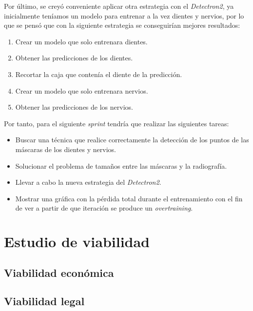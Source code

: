Por último, se creyó conveniente aplicar otra estrategia con el \emph{Detectron2}, ya inicialmente teníamos un modelo para entrenar a la vez dientes y nervios, por lo que se pensó que con la siguiente estrategia se conseguirían mejores resultados:
\begin{enumerate}
    \item Crear un modelo que solo entrenara dientes.
    \item Obtener las predicciones de los dientes.
    \item Recortar la caja que contenía el diente de la predicción.
    \item Crear un modelo que solo entrenara nervios.
    \item Obtener las predicciones de los nervios.
\end{enumerate}
Por tanto, para el siguiente \emph{sprint} tendría que realizar las siguientes tareas:
\begin{itemize}
    \item Buscar una técnica que realice correctamente la detección de los puntos de las máscaras de los dientes y nervios.
    \item Solucionar el problema de tamaños entre las máscaras y la radiografía.
    \item Llevar a cabo la nueva estrategia del \emph{Detectron2}.
    \item Mostrar una gráfica con la pérdida total durante el entrenamiento con el fin de ver a partir de que iteración se produce un \emph{overtraining}.
\end{itemize}
\section{Estudio de viabilidad}

\subsection{Viabilidad económica}

\subsection{Viabilidad legal}


